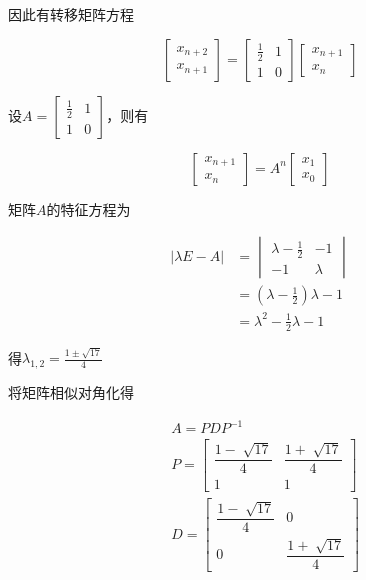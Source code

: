 因此有转移矩阵方程

\begin{equation}
    \begin{bmatrix}
        x_{n+2} \\
        x_{n+1} 
    \end{bmatrix} =
    \begin{bmatrix}
        \frac{1}{2} & 1 \\
        1 & 0 
    \end{bmatrix}
    \begin{bmatrix}
        x_{n+1} \\
        x_n
    \end{bmatrix}
\end{equation}

设$A = \begin{bmatrix}
    \frac{1}{2} & 1 \\
    1 & 0 
\end{bmatrix}$，则有

\begin{equation}
    \begin{bmatrix}
        x_{n+1} \\
        x_{n} 
    \end{bmatrix} =
    A^n
    \begin{bmatrix}
        x_{1} \\
        x_0
    \end{bmatrix}
\end{equation}

矩阵$A$的特征方程为

\begin{equation}
    \begin{split}  
   |\lambda E - A | &= 
   \begin{vmatrix}
    \lambda - \frac{1}{2} & -1 \\
    -1 & \lambda 
   \end{vmatrix}
   \\
   &=(\lambda -\frac{1}{2})\lambda - 1\\
   &= \lambda ^ 2 - \frac{1}{2} \lambda  -1
\end{split}
\end{equation}

得$\lambda_{1,2} = \frac{1 \pm \sqrt{17} }{4} $

将矩阵相似对角化得

\begin{equation}
    \begin{aligned}
    &A = PDP^{-1} \\
    &P = \begin{bmatrix}
        \dfrac{1-\sqrt[]{17}}{4} & \dfrac{1+\sqrt[]{17}}{4} \\
        1 & 1 
    \end{bmatrix}
    \\
    &D=\begin{bmatrix}
        \dfrac{1-\sqrt[]{17}}{4} & 0 \\
        0 & \dfrac{1+\sqrt[]{17}}{4} 
    \end{bmatrix}
\end{aligned} 
\end{equation}

